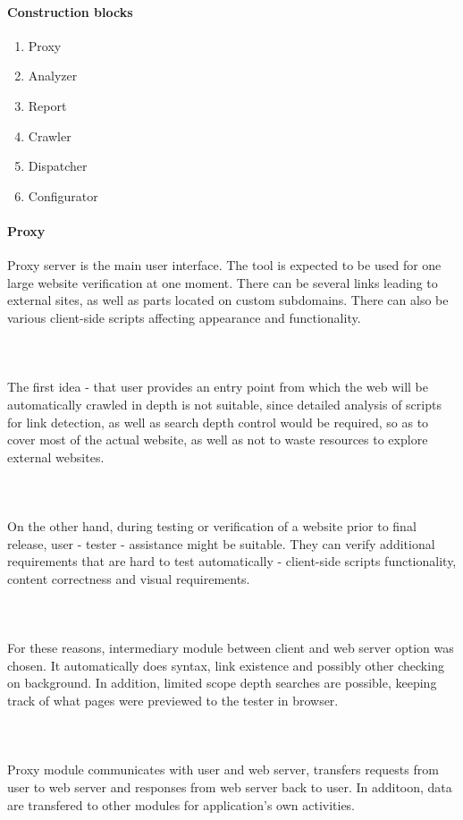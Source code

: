 \documentclass[10pt]{article}
\begin{document}
\paragraph{Construction blocks}
\begin{enumerate}
	\item Proxy
	\item Analyzer
	\item Report
	\item Crawler
	\item Dispatcher
	\item Configurator
\end{enumerate}
\paragraph{Proxy} Proxy server is the main user interface. The tool is expected to be used for one large website verification at one moment. There can be several links leading to external sites, as well as parts located on custom subdomains. There can also be various client-side scripts affecting appearance and functionality.
\paragraph{~} The first idea - that user provides an entry point from which the web will be automatically crawled in depth is not suitable, since detailed analysis of scripts for link detection, as well as search depth control would be required, so as to cover most of the actual website, as well as not to waste resources to explore external websites.
\paragraph{~} On the other hand, during testing or verification of a website prior to final release, user - tester - assistance might be suitable. They can verify additional requirements that are hard to test automatically - client-side scripts functionality, content correctness and visual requirements.
\paragraph{~} For these reasons, intermediary module between client and web server option was chosen. It automatically does syntax, link existence and possibly other checking on background. In addition, limited scope depth searches are possible, keeping track of what pages were previewed to the tester in browser.
\paragraph{~} Proxy module communicates with user and web server, transfers requests from user to web server and responses from web server back to user. In additoon, data are transfered to other modules for application's own activities. 
\end{document}
